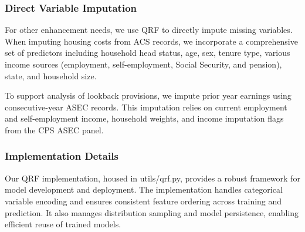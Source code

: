 \subsubsection{Direct Variable Imputation}

For other enhancement needs, we use QRF to directly impute missing variables. When imputing housing costs from ACS records, we incorporate a comprehensive set of predictors including household head status, age, sex, tenure type, various income sources (employment, self-employment, Social Security, and pension), state, and household size.

To support analysis of lookback provisions, we impute prior year earnings using consecutive-year ASEC records. This imputation relies on current employment and self-employment income, household weights, and income imputation flags from the CPS ASEC panel.

\subsubsection{Implementation Details}

Our QRF implementation, housed in utils/qrf.py, provides a robust framework for model development and deployment. The implementation handles categorical variable encoding and ensures consistent feature ordering across training and prediction. It also manages distribution sampling and model persistence, enabling efficient reuse of trained models.